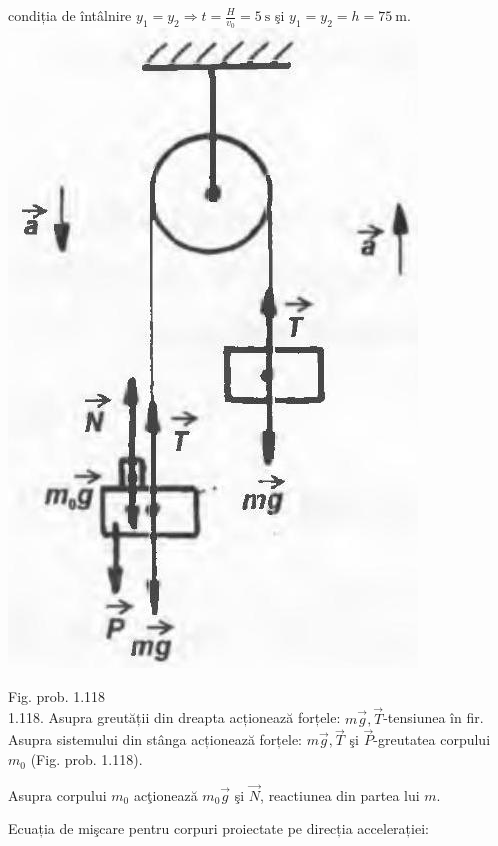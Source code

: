 \documentclass[10pt]{article}
\begin{document}
condiția de întâlnire $y_{1}=y_{2} \Rightarrow t=\frac{H}{v_{0}}=5 \mathrm{~s}$ şi $y_{1}=y_{2}=h=75 \mathrm{~m}$.\\
\includegraphics[max width=\textwidth, center]{2025_07_01_5b3ff9fa0d508c8e9f17g-222}

Fig. prob. 1.118\\
1.118. Asupra greutății din dreapta acționează forțele: $m \vec{g}, \vec{T}$-tensiunea în fir. Asupra sistemului din stânga acționează forțele: $m \vec{g}, \vec{T}$ şi $\vec{P}$-greutatea corpului $m_{0}$ (Fig. prob. 1.118).

Asupra corpului $m_{0}$ acţionează $m_{0} \vec{g}$ şi $\vec{N}$, reactiunea din partea lui $m$.

Ecuația de mişcare pentru corpuri proiectate pe direcția accelerației:
\end{document}
